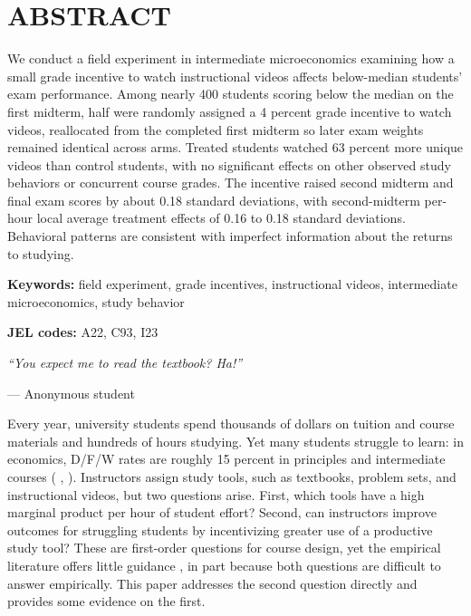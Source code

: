 \section*{ABSTRACT}
We conduct a field experiment in intermediate microeconomics examining how a small grade incentive to watch instructional videos affects below-median students' exam performance.
Among nearly 400 students scoring below the median on the first midterm, half were randomly assigned a 4 percent grade incentive to watch videos, reallocated from the completed first midterm so later exam weights remained identical across arms.
Treated students watched 63 percent more unique videos than control students, with no significant effects on other observed study behaviors or concurrent course grades.
The incentive raised second midterm and final exam scores by about 0.18 standard deviations, with second-midterm per-hour local average treatment effects of 0.16 to 0.18 standard deviations.
Behavioral patterns are consistent with imperfect information about the returns to studying.

\vspace{0.5\baselineskip}
\noindent\textbf{Keywords:} field experiment, grade incentives, instructional videos, intermediate microeconomics, study behavior

\noindent\textbf{JEL codes:} A22, C93, I23

\clearpage


\epigraph{\textit{``You expect me to read the textbook? Ha!''}}{--- Anonymous student}\bigskip

Every year, university students spend thousands of dollars on tuition and course materials and hundreds of hours studying.
Yet many students struggle to learn: in economics, D/F/W rates are roughly 15 percent in principles and intermediate courses (\citeauthor{em2023} \citeyear{em2023}, \citeyear{em2024}).
Instructors assign study tools, such as textbooks, problem sets, and instructional videos, but two questions arise.
First, which tools have a high marginal product per hour of student effort?
Second, can instructors improve outcomes for struggling students by incentivizing greater use of a productive study tool?
These are first-order questions for course design, yet the empirical literature offers little guidance \parencite{aws2015}, in part because both questions are difficult to answer empirically.
This paper addresses the second question directly and provides some evidence on the first.

